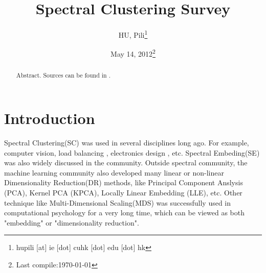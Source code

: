

\usepackage{algorithm}
\usepackage{algorithmic}
\renewcommand{\algorithmicrequire}{\textbf{Input:}}
\renewcommand{\algorithmicensure}{\textbf{Output:}}

\usepackage{subfigure}


\author{HU, Pili\thanks{hupili [at] ie [dot] cuhk [dot] edu [dot] hk}}

\title{Spectral Clustering Survey}
\date{May 14, 2012\thanks{Last compile:\today}}



\maketitle
\begin{abstract}
	Abstract. Sources can be found in \cite{hu2012-spectral2hop}. 
\end{abstract}

\pagebreak
\setcounter{tocdepth}{2}
\tableofcontents
\pagebreak



\section{Introduction}
\label{sec:introduction}

Spectral Clustering(SC) was used in several disciplines long ago. 
For example, computer vision\cite{shi2000normalized}, load balancing
\cite{hendrickson1993multidimensional}, electronics design
\cite{hadley1992efficient}, etc.  Spectral Embeding(SE) was 
also widely discussed in the community\cite{brand2003unifying}. 
Outside spectral community, the machine learning community also 
developed many linear or non-linear Dimensionality Reduction(DR) methods, 
like Principal Component Anslysis (PCA), Kernel PCA (KPCA)\cite{scholkopf1998kpca}, 
Locally Linear Embedding (LLE)\cite{roweis2000lle}, etc. 
Other technique like Multi-Dimensional Scaling(MDS) was successfully 
used in computational psychology for a very long time\cite{borg2005modern}, 
which can be viewed as both "embedding" or "dimensionality reduction".


